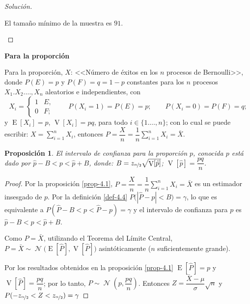 \documentclass[a5paper,doc,10pt,noapacite]{apa6}
\newcommand{\dsum}{\displaystyle \sum}
\DeclareMathOperator{\Esp}{E}
\DeclareMathOperator{\Var}{V}
\DeclareMathOperator{\Normal}{\mathcal{N}}
\newtheorem{proposicion}{Proposición}
\newcommand{\neodefi}[1]{%
	\vspace{1\baselineskip}
	\textbf{\small#1} \newline
}
\begin{document}
{{\begin{proof}[Solución]
\begin{APAenumerate}
	El tamaño mínimo de la muestra es \(91\).			\qedhere
	\end{APAenumerate}
\end{proof}



\neodefi{Para la proporción}

Para la proporción, \(X\): <<Número de éxitos en los \(n\) procesos de Bernoulli>>, donde \(P(E)=p\) y \(P(F)=q=1-p\) constantes para los \(n\) procesos \(X_1.X_2.\ldots,X_n\) aleatorios e independientes, con 
\[
	X_i=\begin{cases} 1 & E,\\ 0 & F;\end{cases}
	\qquad
	P(X_i=1)=P(E)=p;
	\qquad
	P(X_i=0)=P(F)=q;
\]
y \(\Esp[X_i]=p\), \(\Var[X_i]=pq\), para todo \(i \in \{1.\ldots,n\}\); con lo cual se puede escribir: \( X=\displaystyle\sum_{i=1}^{n}X_i\), entonces \(P=\dfrac{X}{n}=\dfrac{1}{n}\dsum_{i=1}^{n}X_i=\bar{X}\).

\begin{proposicion}
	El intervalo de confianza para la proporción \(p\), conocida \(p\) está dado por \(\hat{p}-B<p<\hat{p}+B\), donde: \(B=z_{\nicefrac{\alpha}{2}}\sqrt{\Var[\hat{p}]}\); \(\Var[\hat{p}]=\dfrac{pq}{n}\).
\end{proposicion}
\begin{proof}
	Por la proposición \eqref{prop-4.1}, \(P=\dfrac{X}{n}=\dfrac{1}{n}\displaystyle\sum_{i=1}^{n}X_i=\bar{X}\) es un estimador insesgado de \(p\). Por la definición \eqref{def-4.4} \(P\big(\left|\hat{P}-p\right|<B\big)=\gamma\), lo que es equivalente a  \(P(\hat{P}-B<p<\hat{P}-p)=\gamma\) y el intervalo de confianza para  \(p\) es \(\hat{p}-B<p<\hat{p}+B\).
	
	Como \(P=\bar{X}\), utilizando el Teorema del Límite Central, \(P=\bar{X}\sim\Normal\big(\Esp[\hat{P}],\Var[\hat{P}]\big)\) asintóticamente (\(n\) suficientemente grande).
	
	Por los resultados obtenidos en la proposición \eqref{prop-4.1} \(\Esp[\hat{P}]=p\) y \(\Var[\hat{P}]=\dfrac{pq}{n}\); por lo tanto, \(P\sim\Normal\left(p,\dfrac{pq}{n}\right)\). Entonces \(Z=\dfrac{\bar{X}-\mu}{\sigma}\sqrt{n}\) y \(P(-z_{\nicefrac{\alpha}{2}}<Z<z_{\nicefrac{\alpha}{2}})=\gamma\)
	

\end{proof}}}
\end{document}
